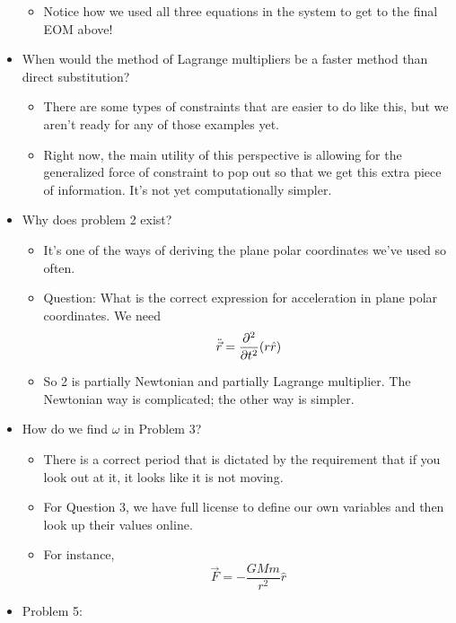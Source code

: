 \documentclass[../notes.tex]{subfiles}
\begin{document}
\begin{itemize}
\begin{itemize}
        \item Notice how we used all three equations in the system to get to the final EOM above!
    \end{itemize}
    \item When would the method of Lagrange multipliers be a faster method than direct substitution?
    \begin{itemize}
        \item There are some types of constraints that are easier to do like this, but we aren't ready for any of those examples yet.
        \item Right now, the main utility of this perspective is allowing for the generalized force of constraint to pop out so that we get this extra piece of information. It's not yet computationally simpler.
    \end{itemize}
    \item Why does problem 2 exist?
    \begin{itemize}
        \item It's one of the ways of deriving the plane polar coordinates we've used so often.
        \item Question: What is the correct expression for acceleration in plane polar coordinates. We need
        \begin{equation*}
            \ddot{\vec{r}} = \pdv[2]{t}(r\hat{r})
        \end{equation*}
        \item So 2 is partially Newtonian and partially Lagrange multiplier. The Newtonian way is complicated; the other way is simpler.
    \end{itemize}
    \item How do we find $\omega$ in Problem 3?
    \begin{itemize}
        \item There is a correct period that is dictated by the requirement that if you look out at it, it looks like it is not moving.
        \item For Question 3, we have full license to define our own variables and then look up their values online.
        \item For instance,
        \begin{equation*}
            \vec{F} = -\frac{GMm}{r^2}\hat{r}
        \end{equation*}
    \end{itemize}
    \item Problem 5:
    \begin{itemize}

\end{itemize}
\end{itemize}
\end{document}
